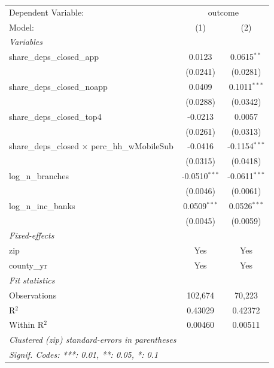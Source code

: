 \begingroup
\centering
\begin{tabular}{lcc}
   \tabularnewline \midrule \midrule
   Dependent Variable: & \multicolumn{2}{c}{outcome}\\
   Model:                                                 & (1)             & (2)\\  
   \midrule
   \emph{Variables}\\
   share\_deps\_closed\_app                               & 0.0123          & 0.0615$^{**}$\\   
                                                          & (0.0241)        & (0.0281)\\   
   share\_deps\_closed\_noapp                             & 0.0409          & 0.1011$^{***}$\\   
                                                          & (0.0288)        & (0.0342)\\   
   share\_deps\_closed\_top4                              & -0.0213         & 0.0057\\   
                                                          & (0.0261)        & (0.0313)\\   
   share\_deps\_closed $\times$ perc\_hh\_wMobileSub      & -0.0416         & -0.1154$^{***}$\\   
                                                          & (0.0315)        & (0.0418)\\   
   log\_n\_branches                                       & -0.0510$^{***}$ & -0.0611$^{***}$\\   
                                                          & (0.0046)        & (0.0061)\\   
   log\_n\_inc\_banks                                     & 0.0509$^{***}$  & 0.0526$^{***}$\\   
                                                          & (0.0045)        & (0.0059)\\   
   \midrule
   \emph{Fixed-effects}\\
   zip                                                    & Yes             & Yes\\  
   county\_yr                                             & Yes             & Yes\\  
   \midrule
   \emph{Fit statistics}\\
   Observations                                           & 102,674         & 70,223\\  
   R$^2$                                                  & 0.43029         & 0.42372\\  
   Within R$^2$                                           & 0.00460         & 0.00511\\  
   \midrule \midrule
   \multicolumn{3}{l}{\emph{Clustered (zip) standard-errors in parentheses}}\\
   \multicolumn{3}{l}{\emph{Signif. Codes: ***: 0.01, **: 0.05, *: 0.1}}\\
\end{tabular}
\par\endgroup

